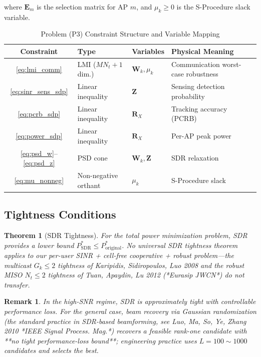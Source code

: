 \documentclass[12pt,a4paper]{article}
\newcommand{\mat}[1]{\mathbf{#1}}
\newtheorem{theorem}{Theorem}
\newtheorem{remark}{Remark}
\begin{document}
where $\mat{E}_m$ is the selection matrix for AP $m$, and $\mu_k \geq 0$ is the S-Procedure slack variable.

\begin{table}[htbp]
\centering
\caption{Problem (P3) Constraint Structure and Variable Mapping}\label{tab:p3_structure}
\begin{tabular}{clll}
\toprule
Constraint & Type & Variables & Physical Meaning \\
\midrule
\eqref{eq:lmi_comm} & LMI ($MN_t+1$ dim.) & $\mat{W}_k, \mu_k$ & Communication worst-case robustness \\
\eqref{eq:sinr_sens_sdp} & Linear inequality & $\mat{Z}$ & Sensing detection probability \\
\eqref{eq:pcrb_sdp} & Linear inequality & $\mat{R}_X$ & Tracking accuracy (PCRB) \\
\eqref{eq:power_sdp} & Linear inequality & $\mat{R}_X$ & Per-AP peak power \\
\eqref{eq:psd_w}--\eqref{eq:psd_z} & PSD cone & $\mat{W}_k, \mat{Z}$ & SDR relaxation \\
\eqref{eq:mu_nonneg} & Non-negative orthant & $\mu_k$ & S-Procedure slack \\
\bottomrule
\end{tabular}
\end{table}



\subsection{Tightness Conditions}

\begin{theorem}[SDR Tightness]\label{thm:1}
For the total power minimization problem, SDR provides a lower bound $P_{\text{SDR}}^* \leq P_{\text{original}}^*$. No universal SDR tightness theorem applies to our per-user SINR + cell-free cooperative + robust problem—the multicast $G_k \leq 2$ tightness of Karipidis, Sidiropoulos, Luo 2008 and the robust MISO $N_t \leq 2$ tightness of Tuan, Apaydin, Lu 2012 (*Eurasip JWCN*) do not transfer.
\end{theorem}

\begin{remark}
In the high-SNR regime, SDR is approximately tight with controllable performance loss. For the general case, beam recovery via Gaussian randomization (the standard practice in SDR-based beamforming, see Luo, Ma, So, Ye, Zhang 2010 *IEEE Signal Process. Mag.*) recovers a feasible rank-one candidate with **no tight performance-loss bound**; engineering practice uses $L = 100 \sim 1000$ candidates and selects the best.
\end{remark}
\end{document}
